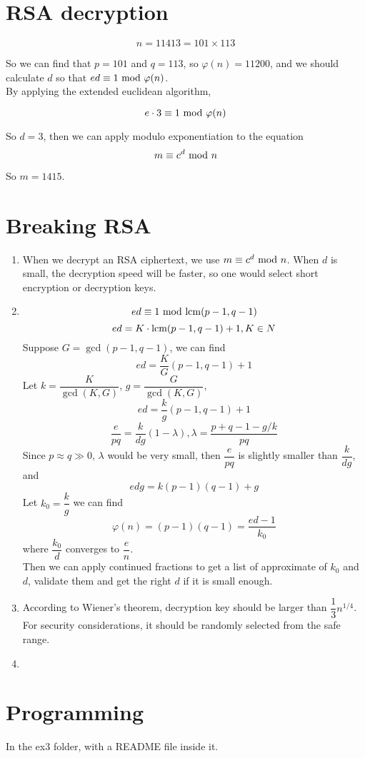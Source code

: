 \documentclass{article}
\renewcommand{\mod}{{\rm\ mod\ }}
\begin{document}
\section{RSA decryption}
$$n=11413=101\times113$$

So we can find that $p=101$ and $q=113$, so $\varphi(n)=11200$, and we should calculate $d$ so that $ed\equiv1\mod \varphi(n)$.\\[-0.5em]

By applying the extended euclidean algorithm,

$$e\cdot3\equiv1\mod \varphi(n)$$

So $d=3$, then we can apply modulo exponentiation to the equation
$$m\equiv c^d\mod n$$


So $m=1415$.

\section{Breaking RSA}
\begin{enumerate}
\item 
When we decrypt an RSA ciphertext, we use $m\equiv c^d\mod n$. When $d$ is small, the decryption speed will be faster, so one would select short encryption or decryption keys.
\item
$$ed\equiv1\mod{\rm lcm}(p-1,q-1)$$
$$ed=K\cdot{\rm lcm}(p-1,q-1)+1,K\in N$$
Suppose $G=\gcd(p-1,q-1)$, we can find
$$ed=\frac{K}{G}(p-1,q-1)+1$$
Let $k=\dfrac{K}{\gcd(K,G)}$, $g=\dfrac{G}{\gcd(K,G)}$,
$$ed=\frac{k}{g}(p-1,q-1)+1$$
$$\frac{e}{pq}=\frac{k}{dg}(1-\lambda),\lambda=\frac{p+q-1-g/k}{pq}$$
Since $p\approx q\gg0$, $\lambda$ would be very small, then $\dfrac{e}{pq}$ is slightly smaller than $\dfrac{k}{dg}$, and
$$edg=k(p-1)(q-1)+g$$
Let $k_0=\dfrac{k}{g}$ we can find
$$\varphi(n)=(p-1)(q-1)=\frac{ed-1}{k_0}$$
where $\dfrac{k_0}{d}$ converges to $\dfrac{e}{n}$.\\
Then we can apply continued fractions to get a list of approximate of $k_0$ and $d$, validate them and get the right $d$ if it is small enough.
\item
According to Wiener's theorem, decryption key should be larger than $\dfrac{1}{3}n^{1/4}$. For security considerations, it should be randomly selected from the safe range.
\item

\end{enumerate}

\section{Programming}
In the ex3 folder, with a README file inside it.
\end{document}
